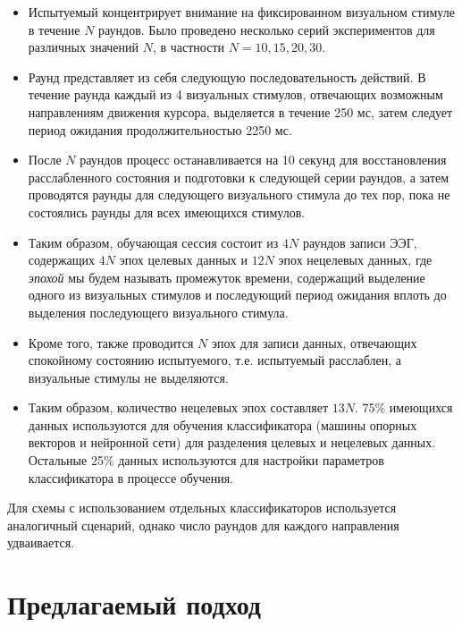 \documentclass[12pt,fleqn]{article}
\begin{document}
	\begin{itemize} 
	\item
	Испытуемый концентрирует внимание на фиксированном визуальном стимуле в течение $N$ раундов. Было проведено несколько серий экспериментов для различных значений $N$, в частности $N = 10, 15, 20, 30.$
	\item
	Раунд представляет из себя следующую последовательность действий. В течение раунда каждый из 4 визуальных стимулов, отвечающих возможным направлениям движения курсора, выделяется в течение 250 мс, затем следует период ожидания продолжительностью 2250 мс. 
	\item
	После $N$ раундов процесс останавливается на 10 секунд для восстановления расслабленного состояния и подготовки к следующей серии раундов, а затем проводятся раунды для следующего визуального стимула до тех пор, пока не состоялись раунды для всех имеющихся стимулов.
	\item
	Таким образом, обучающая сессия состоит из $4N$ раундов записи ЭЭГ, содержащих $4N$ эпох целевых данных и $12N$ эпох нецелевых данных, где {\it эпохой} мы будем называть промежуток времени, содержащий выделение одного из визуальных стимулов и последующий период ожидания вплоть до выделения последующего визуального стимула.
	\item
	Кроме того, также проводится $N$ эпох для записи данных, отвечающих спокойному состоянию испытуемого, т.е. испытуемый расслаблен, а визуальные стимулы не выделяются.
	\item
	Таким образом, количество нецелевых эпох составляет $13N$. 75\% имеющихся данных используются для обучения классификатора (машины опорных векторов и нейронной сети) для разделения целевых и нецелевых данных. Остальные 25\% данных используются для настройки параметров классификатора в процессе обучения.
	\end{itemize}
	\par Для схемы с использованием отдельных классификаторов используется аналогичный сценарий, однако число раундов для каждого направления удваивается.

\newpage
\section{Предлагаемый подход}
\end{document}
